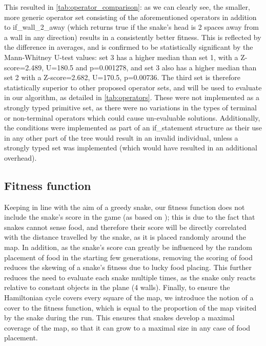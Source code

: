 \documentclass[british,10pt,a4paper]{article}
\begin{document}
This resulted in \autoref{tab:operator_comparison}: as we can clearly see, the smaller, more generic operator set consisting of the aforementioned operators in addition to if\_wall\_2\_away (which returns true if the snake's head is 2 spaces away from a wall in any direction) results in a consistently better fitness. This is reflected by the difference in averages, and is confirmed to be statistically significant by the Mann-Whitney U-test values: set 3 has a higher median than set 1, with a Z-score=2.489, U=180.5 and p=0.001278, and set 3 also has a higher median than set 2 with a Z-score=2.682, U=170.5, p=0.00736. The third set is therefore statistically superior to other proposed operator sets, and will be used to evaluate in our algorithm, as detailed in \autoref{tab:operators}. These were not implemented as a strongly typed primitive set, as there were no variations in the types of terminal or non-terminal operators which could cause un-evaluable solutions. Additionally, the conditions were implemented as part of an if\_statement structure as their use in any other part of the tree would result in an invalid individual, unless a strongly typed set was implemented (which would have resulted in an additional overhead).

\subsection{Fitness function}
\label{subsec:fitness_func}
Keeping in line with the aim of a greedy snake, our fitness function does not include the snake's score in the game (as based on \cite{Christopher_Lockhart2010-em}); this is due to the fact that snakes cannot sense food, and therefore their score will be directly correlated with the distance travelled by the snake, as it is placed randomly around the map. In addition, as the snake's score can greatly be influenced by the random placement of food in the starting few generations, removing the scoring of food reduces the skewing of a snake's fitness due to lucky food placing. This further reduces the need to evaluate each snake multiple times, as the snake only reacts relative to constant objects in the plane (4 walls). Finally, to ensure the Hamiltonian cycle covers every square of the map, we introduce the notion of a cover to the fitness function, which is equal to the proportion of the map visited by the snake during the run. This ensures that snakes develop a maximal coverage of the map, so that it can grow to a maximal size in any case of food placement. 
\end{document}
